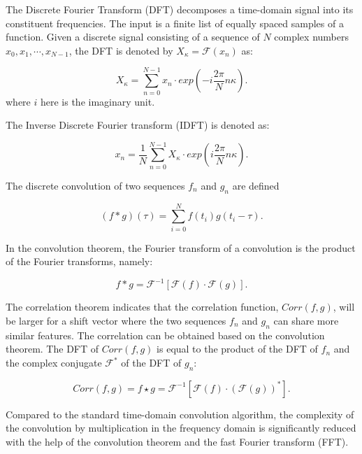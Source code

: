 \documentclass[letterpaper, 10 pt, conference]{ieeeconf}  %
\begin{document}
The Discrete Fourier Transform (DFT) decomposes a time-domain signal into its constituent frequencies. The input is a finite list of equally spaced samples of a function. Given a discrete signal consisting of a sequence of $N$ complex numbers $x_{0},x_{1},\cdots,x_{N-1}$, the DFT is denoted by $X_{\kappa} = \mathcal{F}({x_{n}})$ as:

\begin{equation}\label{equ24}
    X_{\kappa} = \sum_{n=0}^{N-1}x_{n}\cdot exp(-i\frac{2\pi}{N}n\kappa).
\end{equation}
where $i$ here is the imaginary unit. 

The Inverse Discrete Fourier transform (IDFT) is denoted as:

\begin{equation}\label{equ25}
    x_{n} = \frac{1}{N}\sum_{n=0}^{N-1}X_{\kappa}\cdot exp(i\frac{2\pi}{N}n\kappa).
\end{equation}

The discrete convolution of two sequences $f_{n}$ and $g_{n}$  are defined

\begin{equation}\label{equ26}
    (f \ast g)(\tau)=\sum_{i=0}^{N}f(t_{i})g(t_{i}-\tau).
\end{equation}

In the convolution theorem, the Fourier transform of a convolution is the product of the Fourier transforms, namely:

\begin{equation}\label{equ27}
    f \ast g = \mathcal{F}^{-1} [\mathcal{F}(f) \cdot \mathcal{F}(g)].
\end{equation}

The correlation theorem indicates that the correlation function, $Corr(f,g)$, will be larger for a shift vector where the two sequences $f_n$ and $g_n$ can share more similar features. The correlation can be obtained based on the convolution theorem. The DFT of $Corr(f,g)$ is equal to the product of the DFT of $f_{n}$ and the complex conjugate $\mathcal{F}^{*}$ of the DFT of $g_n$:

\begin{equation}\label{equ28}
    Corr(f,g)=f \star g = \mathcal{F}^{-1}[\mathcal{F}(f) \cdot (\mathcal{F}(g))^{*}].
\end{equation}

Compared to the standard time-domain convolution algorithm, the complexity of the convolution by multiplication in the frequency domain is significantly reduced with the help of the convolution theorem and the fast Fourier transform (FFT).
\end{document}
